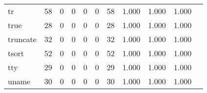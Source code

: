 \begin{longtable}{lp{1.2cm}p{1.2cm}p{1.2cm}p{1.2cm}p{1.2cm}p{1.2cm}p{1.2cm}p{1.2cm}p{1.2cm}p{1.2cm}}
tr        &                                    58 &                                                  0 &                                                  0 &                                                  0 &                                                  0 &                                                 58 &                                              1.000 &                                              1.000 &                                              1.000 \\
true      &                                    28 &                                                  0 &                                                  0 &                                                  0 &                                                  0 &                                                 28 &                                              1.000 &                                              1.000 &                                              1.000 \\
truncate  &                                    32 &                                                  0 &                                                  0 &                                                  0 &                                                  0 &                                                 32 &                                              1.000 &                                              1.000 &                                              1.000 \\
tsort     &                                    52 &                                                  0 &                                                  0 &                                                  0 &                                                  0 &                                                 52 &                                              1.000 &                                              1.000 &                                              1.000 \\
tty       &                                    29 &                                                  0 &                                                  0 &                                                  0 &                                                  0 &                                                 29 &                                              1.000 &                                              1.000 &                                              1.000 \\
uname     &                                    30 &                                                  0 &                                                  0 &                                                  0 &                                                  0 &                                                 30 &                                              1.000 &                                              1.000 &                                              1.000 \\

\end{longtable}
